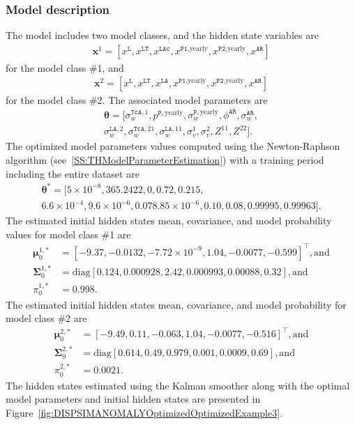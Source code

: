 \subsubsection{Model description}
\label{SS:ModelConstructionExample3}
The model includes two model classes, and the hidden state variables are 
\begin{gather*}
\mathbf{x}^{1}=[x^{\mathtt{L}}, x^{\mathtt{LT}}, x^{\mathtt{LAc}}, x^{\mathtt{P1}\text{,yearly}} , x^{\mathtt{P2}\text{,yearly}}, x^{\mathtt{AR}}]
 \end{gather*}
for the model class \#1, and
\begin{gather*}
\mathbf{x}^{2}=[x^{\mathtt{L}}, x^{\mathtt{LT}}, x^{\mathtt{LA}}, x^{\mathtt{P1}\text{,yearly}} , x^{\mathtt{P2}\text{,yearly}}, x^{\mathtt{AR}}]
 \end{gather*}
for the model class \#2.
The associated model parameters are
\begin{gather*}
\bm\theta=[\sigma_{w}^{\mathtt{TcA},1}, p^{\mathtt{P}, \text{yearly}}, \sigma_{w}^{\mathtt{P}, \text{yearly}}, \phi^{\mathtt{AR}}, \sigma_{w}^{\mathtt{AR}}, \\
 \sigma_{w}^{\mathtt{LA},2}, \sigma_{w}^{\mathtt{TcA}, 21}, \sigma_{w}^{\mathtt{LA}, 11}, \sigma^{1}_{v}, \sigma^{2}_{v}, Z^{11},   Z^{22}] \text{.}
 \end{gather*}
The optimized model parameters values computed using the Newton-Raphson algorithm (see~\ref{SS:THModelParameterEstimation}) with a training period including the entire dataset are
\begin{gather*}
\bm\theta^{\text{*}}=[5\times10^{-8}, 365.2422, 0, 0.72, 0.215, \\
6.6\times10^{-4}, 9.6\times10^{-6}, 0.07 8.85\times10^{-6}, 0.10, 0.08, 0.99995, 0.99963].
\end{gather*}
The estimated initial hidden states mean, covariance,  and model probability values for model class \#1 are 
\begin{align*}
 \bm \mu^{1,\text{*}}_{0} & = [	-9.37 ,	-0.0132	, -7.72\times 10^{-9}	, 1.04  ,	-0.0077	, -0.599    ]^{\intercal}, \text{and} \\
\bm\Sigma^{1,\text{*}}_{0}  & = \text{diag}[	0.124 ,	0.000928,	2.42	,0.000993, 0.00088,	0.32     ],  \text{and} \\
 \pi_{0}^{1,\text{*}} & = 0.998.
\end{align*}
The estimated initial hidden states mean, covariance,  and model probability for model class \#2 are 
\begin{align*}
 \bm \mu^{2,\text{*}}_{0} & = [	-9.49 ,	0.11 ,	-0.063	,  1.04  ,	-0.0077, 	-0.516     ]^{\intercal}, \text{and} \\
 \bm\Sigma^{2,\text{*}}_{0}  & = \text{diag}[	0.614 	,0.49 ,	0.979 ,	0.001,	0.0009	, 0.69    ], \text{and} \\
 \pi_{0}^{2,\text{*}} & = 0.0021.
\end{align*}
The hidden states estimated using the Kalman smoother along with the optimal model parameters and initial hidden states are presented in Figure~\ref{fig:DISPSIMANOMALYOptimizedOptimizedExample3}.


